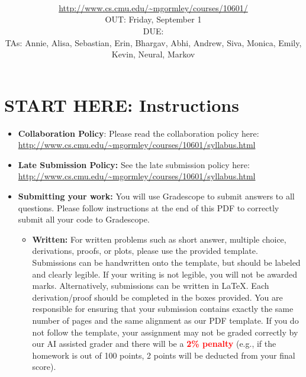 \documentclass[11pt,addpoints,answers]{exam}
\title{\textsc{\hwName}
} %
\author{\courseName\\
\url{http://www.cs.cmu.edu/~mgormley/courses/10601/} \\
OUT: Friday, September 1 \\
DUE: \dueDate{} \\ 
TAs: Annie, Alisa, Sebastian, Erin, Bhargav, Abhi, Andrew, Siva, Monica, Emily, Kevin, Neural, Markov
}
\date{}
\date{}
\newcommand{\homeworktype}{\string hw1}
\begin{document}
\maketitle

\newcommand \maxsubs {10 }
\section*{START HERE: Instructions}
\begin{itemize}

\item \textbf{Collaboration Policy}: Please read the collaboration policy here: \url{http://www.cs.cmu.edu/~mgormley/courses/10601/syllabus.html}

\item\textbf{Late Submission Policy:} See the late submission policy here: \url{http://www.cs.cmu.edu/~mgormley/courses/10601/syllabus.html}

\item\textbf{Submitting your work:} You will use Gradescope to submit
  answers to all questions\ifthenelse{\equal{\homeworktype}{\string written}}{}{ and code}. Please
  follow instructions at the end of this PDF to correctly submit all your code to Gradescope.

\begin{itemize}
    
    \item \textbf{Written:} For written problems such as short answer, multiple choice, derivations, proofs, or plots, please use the provided template. Submissions can be handwritten onto the template, but should be labeled and clearly legible. If your writing is not legible, you will not be awarded marks. Alternatively, submissions can be written in \LaTeX{}. Each derivation/proof should be completed in the boxes provided. You are responsible for ensuring that your submission contains exactly the same number of pages and the same alignment as our PDF template. If you do not follow the template, your assignment may not be graded correctly by our AI assisted grader and there will be a \textbf{\textcolor{red}{2\% penalty}} (e.g., if the homework is out of 100 points, 2 points will be deducted from your final score).


\end{itemize}
\end{itemize}
\end{document}
